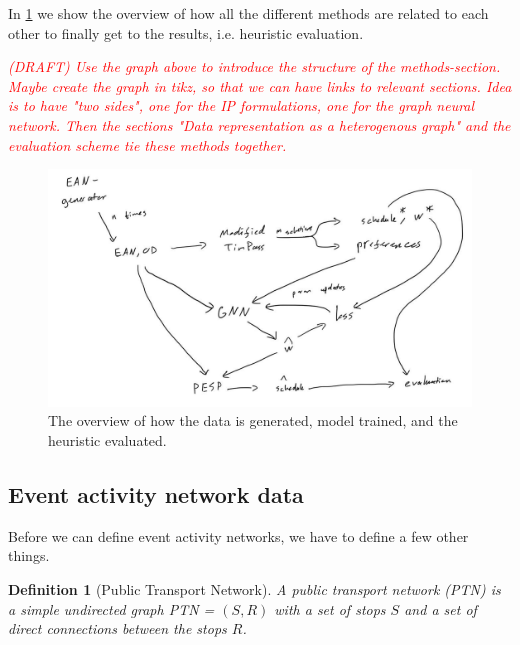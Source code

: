 \documentclass[english, 12pt, a4paper, sci, utf8, a-2b, online]{aaltothesis}
\newtheorem{definition}{Definition}
\newcommand{\draft}[1]{\textcolor{red}{\em (DRAFT) #1}}
\begin{document}
In \cref{fig:process-flow} we show the overview of how all the different methods are related to each other to finally get to the results, i.e. heuristic evaluation.

\draft{
    Use the graph above to introduce the structure of the methods-section. Maybe create the graph in tikz, so that we can have links to relevant sections. Idea is to have "two sides", one for the IP formulations, one for the graph neural network. Then the sections "Data representation as a heterogenous graph" and the evaluation scheme tie these methods together.
}

\begin{figure}
    \centering
    \includegraphics[width=\textwidth]{figures/process-flow.png}
    \caption{The overview of how the data is generated, model trained, and the heuristic evaluated.}
    \label{fig:process-flow}
\end{figure}
\subsection{Event activity network data}
\label{sec:ean-def}







Before we can define event activity networks, we have to define a few other things.
\begin{definition}[Public Transport Network]\label{def:ptn}
    A \textit{public transport network} (PTN) is a simple undirected graph PTN = $(S, R)$ with a set of stops $S$ and a set of direct connections between the stops $R$. 
\end{definition}
\end{document}
